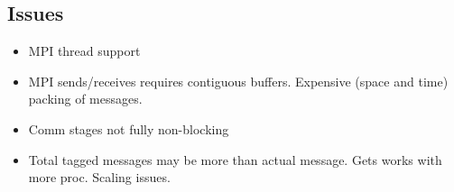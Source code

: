 \subsection{Issues}

\begin{itemize}
\item MPI thread support
\item MPI sends/receives requires contiguous buffers. Expensive (space and time) packing of messages.
\item Comm stages not fully non-blocking
\item Total tagged messages may be more than actual message. Gets works with more proc. Scaling issues.
\end{itemize} 

